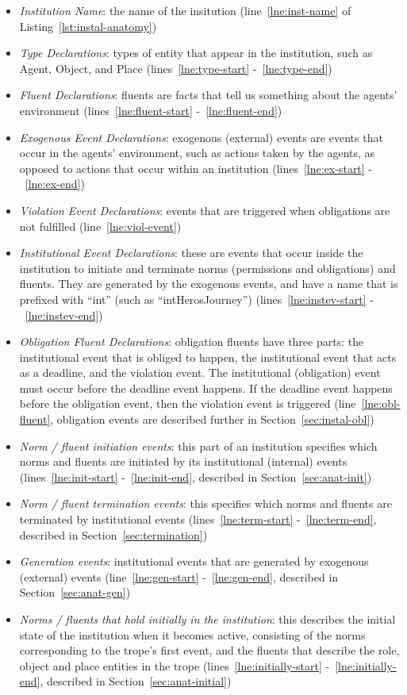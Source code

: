 \documentclass[11pt]{report}
\begin{document}
\begin{itemize}
\item \emph{Institution Name}: the name of the insitution
  (line~\ref{lne:inst-name} of Listing~\ref{lst:instal-anatomy})
\item \emph{Type Declarations}: types of entity that appear in the institution,
  such as Agent, Object, and Place (lines~\ref{lne:type-start} -~\ref{lne:type-end})
\item \emph{Fluent Declarations}: fluents are facts that tell us something about
  the agents' environment (lines~\ref{lne:fluent-start} -~\ref{lne:fluent-end})
\item \emph{Exogenous Event Declarations}: exogenous (external) events are
  events that occur in the agents' environment, such as actions taken by the
  agents, as opposed to actions that occur within an institution
  (lines~\ref{lne:ex-start} -~\ref{lne:ex-end})
\item \emph{Violation Event Declarations}: events that are triggered when obligations
  are not fulfilled (line~\ref{lne:viol-event})
\item \emph{Institutional Event Declarations}: these are events that occur
  inside the institution to initiate and terminate norms (permissions and
  obligations) and fluents. They are generated by the exogenous events, and have
  a name that is prefixed with ``int'' (such as ``intHerosJourney'')
  (lines~\ref{lne:instev-start} -~\ref{lne:instev-end})
\item \emph{Obligation Fluent Declarations}: obligation fluents have three
  parts: the institutional event that is obliged to happen, the institutional
  event that acts as a deadline, and the violation event. The institutional
  (obligation) event must occur before the deadline event happens. If the deadline event
  happens before the obligation event, then the violation event is triggered
  (line~\ref{lne:obl-fluent}, obligation events are described further in Section~\ref{sec:instal-obl})
\item \emph{Norm / fluent initiation events}: this part of an institution
  specifies which norms and fluents are initiated by its institutional
  (internal) events (lines~\ref{lne:init-start} -~\ref{lne:init-end}, described
  in Section~\ref{sec:anat-init})
\item \emph{Norm / fluent termination events}: this specifies which norms and
  fluents are terminated by institutional events (lines~\ref{lne:term-start}
  -~\ref{lne:term-end}, described in Section~\ref{sec:termination})
\item \emph{Generation events}: institutional events that are generated by
  exogenous (external) events (line~\ref{lne:gen-start} -~\ref{lne:gen-end},
  described in Section~\ref{sec:anat-gen})
\item \emph{Norms / fluents that hold initially in the institution}: this
  describes the initial state of the institution when it becomes active,
  consisting of the norms corresponding to the trope's first event, and the
  fluents that describe the role, object and place entities in the trope
  (lines~\ref{lne:initially-start} -~\ref{lne:initially-end}, described in Section~\ref{sec:anat-initial})
\end{itemize}
\end{document}
